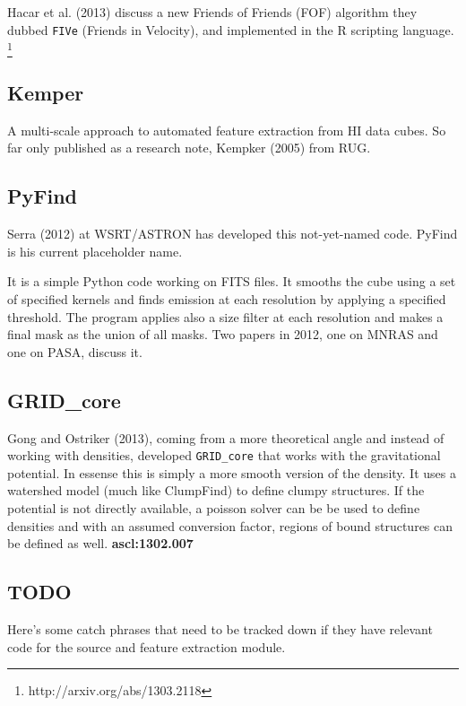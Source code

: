 \documentclass[preprint]{aastex} %
\begin{document}
Hacar et al. (2013) discuss a new Friends of Friends (FOF) 
algorithm they dubbed {\tt FIVe} (Friends in Velocity), and
implemented in the R scripting language.
\footnote{http://arxiv.org/abs/1303.2118}


\subsection{Kemper}

A multi-scale approach to automated feature extraction from HI
data cubes. 
So far only published as a research note, Kempker (2005) from RUG.


\subsection{PyFind}

Serra (2012) at WSRT/ASTRON
has developed this not-yet-named code. PyFind is his current 
placeholder name. 

It is a simple Python code working on FITS files. It smooths
the cube using a set of specified kernels and finds emission at each
resolution by applying a specified threshold. The program applies also
a size filter at each resolution and makes a final mask as the union
of all masks. Two papers in 2012, one on MNRAS and one on PASA, discuss
it.

\subsection{GRID\_core}

Gong and Ostriker (2013),
coming from a more theoretical angle and 
instead of working with densities, developed 
{\tt GRID\_core} that works with
the gravitational potential.
In essense this is simply a more smooth version of
the density. It uses a watershed model (much like ClumpFind)
to define clumpy structures.  If the potential is not directly
available, a poisson solver can be be used to define densities
and with an assumed conversion factor, regions of bound structures
can be defined as well.  {\bf ascl:1302.007}


\subsection{TODO}

Here's some catch phrases that need to be tracked down if they have
relevant code for the source and feature extraction module.
\end{document}
